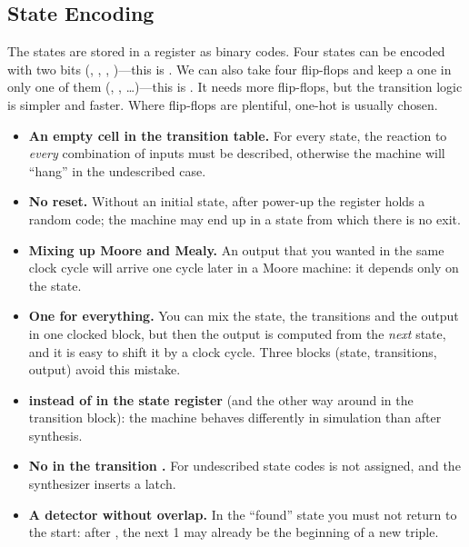 \subsection{State Encoding}

The states are stored in a register as binary codes. Four states can be
encoded with two bits (, , , )---this is
. We can also take four flip-flops and keep a one in
only one of them (, , \ldots)---this is
. It needs more flip-flops, but the transition logic is
simpler and faster. Where flip-flops are plentiful, one-hot is usually chosen.

\begin{warnbox}
\begin{itemize}
  \item \textbf{An empty cell in the transition table.} For every state, the
        reaction to \emph{every} combination of inputs must be described,
        otherwise the machine will ``hang'' in the undescribed case.
  \item \textbf{No reset.} Without an initial state, after power-up the
        register holds a random code; the machine may end up in a state from
        which there is no exit.
  \item \textbf{Mixing up Moore and Mealy.} An output that you wanted in the
        same clock cycle will arrive one cycle later in a Moore machine: it
        depends only on the state.
  \item \textbf{One  for everything.} You can mix the state, the
        transitions and the output in one clocked block, but then the output is
        computed from the \emph{next} state, and it is easy to shift it by a
        clock cycle. Three blocks (state, transitions, output) avoid this
        mistake.
  \item \textbf{\code{=} instead of \code{<=} in the state register} (and the
        other way around in the transition block): the machine behaves
        differently in simulation than after synthesis.
  \item \textbf{No  in the transition .} For undescribed
        state codes  is not assigned, and the synthesizer inserts a
        latch.
  \item \textbf{A detector without overlap.} In the ``found'' state you must
        not return to the start: after , the next 1 may already be the
        beginning of a new triple.
\end{itemize}
\end{warnbox}

